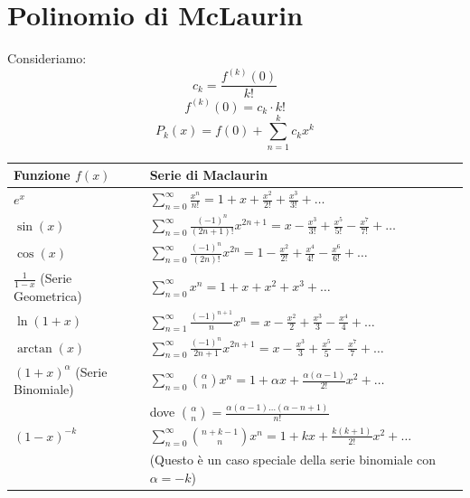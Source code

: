 \documentclass[10pt, a4paper]{article}
\begin{document}
\section{Polinomio di McLaurin}
    Consideriamo:
    \begin{equation*}
        c_k = \frac{f^{(k)}(0)}{k!}
    \end{equation*}
    \begin{equation*}
        f^{(k)}(0) = c_k\cdot k!
    \end{equation*}
    \begin{equation*}
        P_k(x)=f(0)+\sum_{n=1}^{k}c_k x^k
    \end{equation*}
    \begin{center}
        \begin{tabular}{|p{4cm}|p{10.5cm}|}
            \hline
            \textbf{Funzione $f(x)$} & \textbf{Serie di Maclaurin} \\
            \hline
            $e^x$ & $\displaystyle \sum_{n=0}^{\infty} \frac{x^n}{n!} = 1 + x + \frac{x^2}{2!} + \frac{x^3}{3!} + \dots$ \\
            \hline
            $\sin(x)$ & $\displaystyle \sum_{n=0}^{\infty} \frac{(-1)^n}{(2n+1)!}x^{2n+1} = x - \frac{x^3}{3!} + \frac{x^5}{5!} - \frac{x^7}{7!} + \dots$ \\
            \hline
            $\cos(x)$ & $\displaystyle \sum_{n=0}^{\infty} \frac{(-1)^n}{(2n)!}x^{2n} = 1 - \frac{x^2}{2!} + \frac{x^4}{4!} - \frac{x^6}{6!} + \dots$ \\
            \hline
            $\frac{1}{1-x}$ (Serie Geometrica) & $\displaystyle \sum_{n=0}^{\infty} x^n = 1 + x + x^2 + x^3 + \dots$ \\
            \hline
            $\ln(1+x)$ & $\displaystyle \sum_{n=1}^{\infty} \frac{(-1)^{n+1}}{n}x^n = x - \frac{x^2}{2} + \frac{x^3}{3} - \frac{x^4}{4} + \dots$ \\
            \hline
            $\arctan(x)$ & $\displaystyle \sum_{n=0}^{\infty} \frac{(-1)^n}{2n+1}x^{2n+1} = x - \frac{x^3}{3} + \frac{x^5}{5} - \frac{x^7}{7} + \dots$ \\
            \hline
            $(1+x)^\alpha$ (Serie Binomiale) & $\displaystyle \sum_{n=0}^{\infty} \binom{\alpha}{n}x^n = 1 + \alpha x + \frac{\alpha(\alpha-1)}{2!}x^2 + \dots$ \\
            & \quad dove $\binom{\alpha}{n} = \frac{\alpha(\alpha-1)\dots(\alpha-n+1)}{n!}$ \\
            \hline
            $(1-x)^{-k}$ & $\displaystyle \sum_{n=0}^{\infty} \binom{n+k-1}{n}x^n = 1 + kx + \frac{k(k+1)}{2!}x^2 + \dots$ \\
            & (Questo è un caso speciale della serie binomiale con $\alpha = -k$) \\
            \hline
        \end{tabular}
    \end{center}
\end{document}
